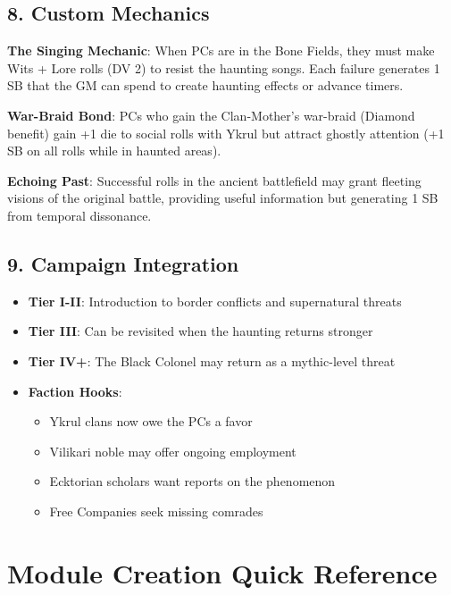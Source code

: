 \documentclass[11pt]{article}
\begin{document}
\subsection*{8. Custom Mechanics}

\begin{mdframed}[backgroundcolor=modulebg]
\textbf{The Singing Mechanic}: When PCs are in the Bone Fields, they must make Wits + Lore rolls (DV 2) to resist the haunting songs. Each failure generates 1 SB that the GM can spend to create haunting effects or advance timers.

\textbf{War-Braid Bond}: PCs who gain the Clan-Mother's war-braid (Diamond benefit) gain +1 die to social rolls with Ykrul but attract ghostly attention (+1 SB on all rolls while in haunted areas).

\textbf{Echoing Past}: Successful rolls in the ancient battlefield may grant fleeting visions of the original battle, providing useful information but generating 1 SB from temporal dissonance.
\end{mdframed}

\subsection*{9. Campaign Integration}

\begin{itemize}[leftmargin=*]
\item \textbf{Tier I-II}: Introduction to border conflicts and supernatural threats
\item \textbf{Tier III}: Can be revisited when the haunting returns stronger
\item \textbf{Tier IV+}: The Black Colonel may return as a mythic-level threat
\item \textbf{Faction Hooks}: 
\begin{itemize}
\item Ykrul clans now owe the PCs a favor
\item Vilikari noble may offer ongoing employment
\item Ecktorian scholars want reports on the phenomenon
\item Free Companies seek missing comrades
\end{itemize}
\end{itemize}

\section*{Module Creation Quick Reference}
\end{document}

